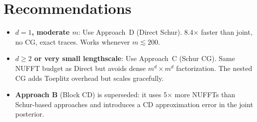 \documentclass[11pt]{article}
\begin{document}
\section{Recommendations}

\begin{itemize}
\item \textbf{$d{=}1$, moderate $m$}: Use Approach~D (Direct Schur).
  8.4$\times$ faster than joint, no CG, exact traces.
  Works whenever $m \lesssim 200$.

\item \textbf{$d \geq 2$ or very small lengthscale}:
  Use Approach~C (Schur CG).
  Same NUFFT budget as Direct but avoids dense $m^d {\times} m^d$
  factorization. The nested CG adds Toeplitz overhead but
  scales gracefully.

\item \textbf{Approach B} (Block CD) is superseded: it uses
  5$\times$ more NUFFTs than Schur-based approaches and
  introduces a CD approximation error in the joint posterior.
\end{itemize}
\end{document}
